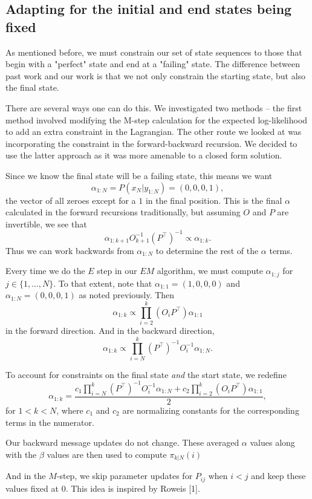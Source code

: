 \documentclass[english]{article}
\numberwithin{equation}{section}
\begin{document}
	\subsection*{Adapting for the initial and end states being fixed}
	As mentioned before, we must constrain our set of state sequences to those that begin with a "perfect" state and end at a "failing" state. The difference between past work and our work is that we not only constrain the starting state, but also the final state.
	
	There are several ways one can do this. We investigated two methods -- the first method involved modifying the M-step calculation for the expected log-likelihood to add an extra constraint in the Lagrangian. The other route we looked at was incorporating the constraint in the forward-backward recursion. We decided to use the latter approach as it was more amenable to a closed form solution.
	
	Since we know the final state will be a failing state, this means we want $$\alpha_{1:N}=P(x_N|y_{1:N})=(0,0,0,1),$$ the vector of all zeroes except for a $1$ in the final position. This is the final $\alpha$ calculated in the forward recursions traditionally, but assuming $O$ and $P$ are invertible, we see that $$\alpha_{1:k+1}O_{k+1}^{-1}(P^{\top})^{-1} \propto \alpha_{1:k}.$$ Thus we can work backwards from $\alpha_{1:N}$ to determine the rest of the $\alpha$ terms.
	
	Every time we do the $E$ step in our $EM$ algorithm, we must compute $\alpha_{1:j}$ for $j\in \{1,\ldots,N\}$. To that extent, note that $\alpha_{1:1}=(1,0,0,0)$ and $\alpha_{1:N}=(0,0,0,1)$ as noted previously. Then $$\alpha_{1:k}\propto \prod_{i=2}^k (O_{i}P^{\top})\alpha_{1:1}$$ in the forward direction. And in the backward direction, $$\alpha_{1:k}\propto \prod_{i=N}^{k} (P^{\top})^{-1} O_{i}^{-1}\alpha_{1:N}.$$
	
	To account for constraints on the final state \textit{and} the start state, we redefine $$\alpha_{1:k} = \frac{c_1\prod_{i=N}^{k} (P^{\top})^{-1} O_{i}^{-1}\alpha_{1:N} + c_2\prod_{i=2}^k (O_{i}P^{\top})\alpha_{1:1}}{2},$$ for $1<k<N$, where $c_1$ and $c_2$ are normalizing constants for the corresponding terms in the numerator.
	
	Our backward message updates do not change. These averaged $\alpha$ values along with the $\beta$ values are then used to compute $\pi_{k|N}(i)$
	
	And in the $M$-step, we skip parameter updates for $P_{ij}$ when $i<j$ and keep these values fixed at $0$. This idea is inspired by Roweis [1].
	
\end{document}
